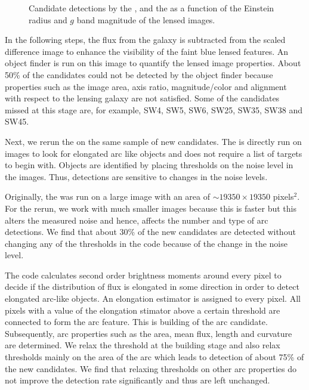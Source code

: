 \documentclass[useAMS,usenatbib,a4paper]{mn2e}
\begin{document}
\begin{figure}
\begin{center}
\caption{ \label{fig:stackremg}
Candidate detections by the \rf, \sw and the \af as a
function of the Einstein radius and $g$ band magnitude of the lensed
images.
}
\end{center}
\end{figure}

In the following steps, the flux from the galaxy is subtracted from the
scaled difference image to enhance the visibility of the faint blue
lensed features. An object finder is run on this image to quantify the
lensed image properties. About 50\% of the \sw candidates could not be
detected by the object finder because properties such as the image area,
axis ratio, magnitude/color and alignment with respect to the lensing
galaxy are not satisfied. Some of the candidates missed at this stage
are, for example, SW4, SW5, SW6, SW25, SW35, SW38 and SW45.


Next, we rerun the \af on the same \sw sample of new candidates. The \af
is directly run on images to look for elongated arc like objects and does
not require a list of targets to begin with. Objects are identified by
placing thresholds on the noise level in the images. Thus, \af
detections are sensitive to changes in the noise levels.

Originally, the \af was run on a large image with an area of $\sim 19350
\times 19350$ pixels$^2$. For the rerun, we work with much smaller
images because this is faster but this alters the measured
noise and hence, affects the number and type of arc detections. We find
that about 30\% of the new candidates are detected without changing any
of the thresholds in the code because of the change in the noise level.

The \af code calculates second order brightness moments around every
pixel to decide if the distribution of flux is elongated in some
direction in order to detect elongated arc-like objects. An elongation
estimator is assigned to every pixel. All pixels with a value of the
elongation stimator above a certain threshold are connected to form the arc
feature. This is building of the arc candidate. Subsequently, arc
properties such as the area, mean flux, length and curvature are
determined. We relax the threshold at the building stage and also relax
thresholds mainly on the area of the arc which leads to detection of
about 75\% of the new \sw candidates. We find that relaxing thresholds
on other arc properties do not improve the detection rate significantly
and thus are left unchanged.
\end{document}
